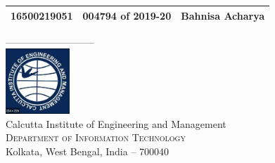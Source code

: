 \documentclass[12pt, a4paper]{report}
\begin{document}
\begin{titlepage}
\begin{center}
\begin{table}[h]
\begin{tabular}{ r  c  l }
16500219051 & 004794 of 2019-20 & Bahnisa Acharya\\
\bottomrule
\end{tabular}
\end{table}
\vspace{.1in}
\vfill
\vspace{0.5in}
---------------------------\\
\vfill
\includegraphics[width=0.18\textwidth]{CIEMLOGO.png}\\[0.1in]
\Large{Calcutta Institute of Engineering and Management}\\
\normalsize
\textsc{Department of Information Technology}\\
Kolkata, West Bengal, India -- 700040 \\
\vspace{0.2cm}

\end{center}

\end{titlepage}
\end{document}
